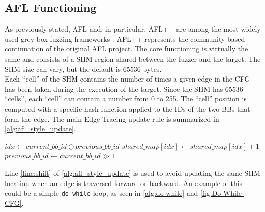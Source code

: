         \subsection{AFL Functioning}
        \cite{afl_technical_details}
            As previously stated, AFL and, in particular, AFL++ are among the most widely used grey-box
            fuzzing frameworks \cite{aflplusplus}.
            AFL++ represents the community-based continuation of the original AFL project.
            The core functioning is virtually the same and consists of a \gls{SHM} region shared between the fuzzer and the target.
            The \gls{SHM} size can vary, but the default is 65536 bytes.\\
            Each ``cell'' of the \gls{SHM} contains the number of times a given edge in the \gls{CFG} has been
                taken during the execution of the target. Since the \gls{SHM} has 65536 ``cells'', each ``cell''
                can contain a number from 0 to 255.
            The ``cell'' position is computed with a specific hash function applied to the IDs of the two \gls{BB}s
            that form the edge.
            The main Edge Tracing update rule is summarized in \cref{alg:afl_style_update}.
            \begin{algorithm}
                \caption{AFL-style SHM update rule}
                \label{alg:afl_style_update}
                \begin{algorithmic}[1]
                    \STATE $idx \gets current\_bb\_id \oplus previous\_bb\_id$ \label{line:xor}
                    \STATE $shared\_map[idx] \gets shared\_map[idx]+1$ \label{line:increment}
                    \STATE $previous\_bb\_id \gets current\_bb\_id \gg 1$ \label{line:shift}
                \end{algorithmic}
            \end{algorithm}
            Line \cref{line:shift} of \cref{alg:afl_style_update} is used to avoid updating the same \gls{SHM}
            location when an edge is traversed forward or backward.
            An example of this could be a simple \texttt{do-while} loop, as seen in \cref{alg:do-while} and \cref{fig:Do-While-CFG}.\\
